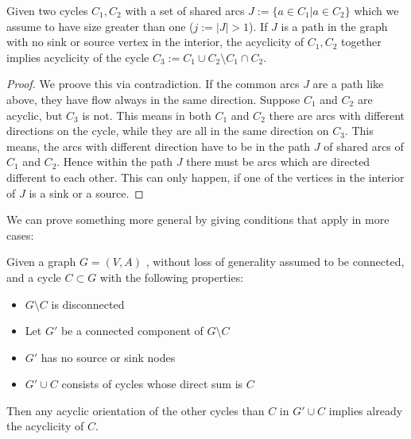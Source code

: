 \begin{prop}
 Given two cycles $C_1, C_2$ with a set of shared arcs $J:=\{a\in C_1|a\in C_2\}$ which we assume to have size greater 
than one ($j:=|J|>1$). If $J$ is a path in the graph with no sink or source vertex in the interior, the acyclicity of 
$C_1, C_2$ together implies acyclicity of the cycle $C_3:=C_1\cup C_2\setminus C_1\cap C_2$.
\end{prop}
\begin{proof}
 We proove this via contradiction. If the common arcs $J$ are a path like above, they have flow always in the same 
direction. Suppose $C_1$ and $C_2$ are acyclic, but $C_3$ is not. This means in both $C_1$ and $C_2$ there are arcs 
with different directions on the cycle, while they are all in the same direction on $C_3$. This means, the arcs with 
different direction have to be in the path $J$ of shared arcs of $C_1$ and $C_2$. Hence within the path $J$ there must 
be arcs which are directed different to each other. This can only happen, if one of the vertices in the interior of $J$ 
is a sink or a source. \Lightning
\end{proof}
We can prove something more general by giving conditions that apply in more cases:
\begin{prop}
 Given a graph $G=(V,A)$ , without loss of generality assumed to be connected, and a cycle $C\subset G$ with the 
following properties:
 \begin{itemize}
  \item $G\setminus C$ is disconnected
  \item Let $G'$ be a connected component of $G\setminus C$ 
  \item $G'$ has no source or sink nodes
  \item $G'\cup C$ consists of cycles whose direct sum is $C$ %
 \end{itemize}
 Then any acyclic orientation of the other cycles than $C$ in $G'\cup C$ implies already the acyclicity of $C$. 

\end{prop}
